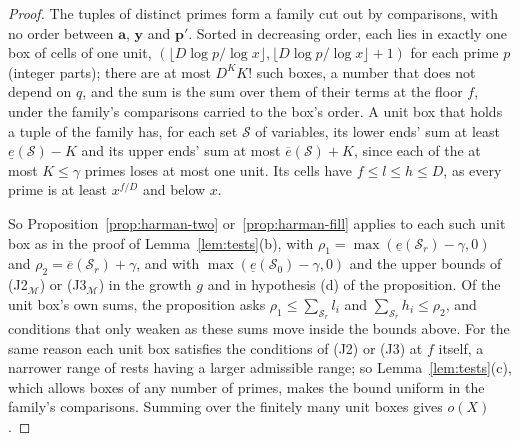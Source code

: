 \documentclass[11pt]{article}
\theoremstyle{definition}
\begin{document}
\begin{proof}
The tuples of distinct primes form a family cut out by comparisons, with no order between $\mathbf a$, $\mathbf y$ and
$\mathbf p'$.
Sorted in decreasing order, each lies in exactly one box of cells of one unit, $(\lfloor D \log p/\log x \rfloor,
\lfloor
D\log p/\log x \rfloor + 1)$ for each prime $p$ (integer parts); there are at most $D^K K!$ such boxes, a number that
does not depend on
$q$, and the sum is the sum over them of their terms at the floor $f$, under the family's comparisons carried to the
box's order. A unit box that holds a tuple of the family has, for each set $\mathcal S$ of variables, its lower ends'
sum at least $\underline e(\mathcal S) - K$ and its upper ends' sum at most $\overline e(\mathcal S) + K$, since each of
the at most $K \le \gamma$ primes loses at most one unit. Its cells
have $f \le l \le h \le D$, as every prime is at least $x^{f/D}$ and below $x$.

So Proposition~\ref{prop:harman-two} or~\ref{prop:harman-fill} applies to each such unit box as in the proof of
Lemma~\ref{lem:tests}(b), with $\rho_1 = \max(\underline e(\mathcal S_r) - \gamma, 0)$ and $\rho_2 = \overline
e(\mathcal S_r) + \gamma$, and with $\max(\underline e(\mathcal S_0) - \gamma, 0)$ and the upper bounds of
(J2$_{\mathcal M}$) or (J3$_{\mathcal M}$) in the growth $g$ and in hypothesis (d) of the proposition. Of the unit box's
own sums, the proposition asks $\rho_1 \le \sum_{\mathcal S_r} l_i$ and $\sum_{\mathcal S_r} h_i \le \rho_2$, and
conditions that only weaken as these sums move inside the bounds above. For the same reason each unit box satisfies the
conditions of (J2) or (J3) at $f$ itself, a narrower range of rests having a larger admissible range; so
Lemma~\ref{lem:tests}(c), which allows boxes of any number of primes, makes the bound uniform in the family's
comparisons. Summing over the finitely many unit boxes gives $o(X)$.
\end{proof}
\end{document}
